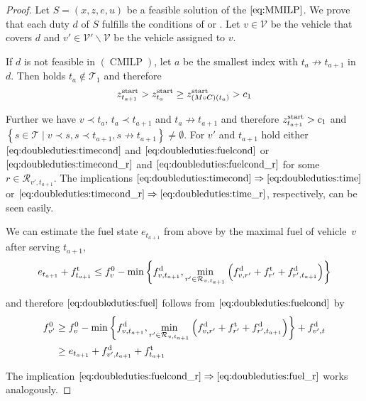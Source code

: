 \begin{proof}

Let $S=\left(x,z,e,u\right)$ be a feasible solution of the $\eqref{eq:MMILP}$. We prove that each duty $d$ of $S$ fulfills the conditions of  or . Let ${v\in\mathcal{V}}$ be the vehicle that covers $d$ and ${v'\in\mathcal{V}'\backslash\mathcal{V}}$ be the vehicle assigned to $v$.

If $d$ is not feasible in $(\operatorname{CMILP})$, let $a$ be the smallest index with ${t_a\not\to t_{a+1}}$ in $d$. Then holds ${t_a\not\in\mathcal{T}_1}$ and therefore
\begin{align*}
	 z^{\operatorname{start}}_{t_{a+1}} > z^{\operatorname{start}}_{t_a} \geq z^{\operatorname{start}}_{\left(M\circ C\right)\left(t_a\right)} > c_1
\end{align*}

Further we have $v\prec t_a$, $t_a\prec t_{a+1}$ and $t_a\not\to t_{a+1}$ and therefore ${z^{\operatorname{start}}_{t_{a+1}}>c_1}$ and ${\left\{s\in\mathcal{T}\mid v\prec s, s\prec t_{a+1}, s\not\to t_{a+1}\right\}\neq\emptyset}$. For $v'$ and $t_{a+1}$ hold either $\eqref{eq:doubleduties:timecond}$ and $\eqref{eq:doubleduties:fuelcond}$ or $\eqref{eq:doubleduties:timecond_r}$ and $\eqref{eq:doubleduties:fuelcond_r}$ for some ${r\in\mathcal{R}_{v',t_{a+1}}}$. The implications ${\eqref{eq:doubleduties:timecond}\Rightarrow\eqref{eq:doubleduties:time}}$ or ${\eqref{eq:doubleduties:timecond_r}\Rightarrow\eqref{eq:doubleduties:time_r}}$, respectively, can be seen easily.

We can estimate the fuel state $e_{t_{a+1}}$ from above by the maximal fuel of vehicle~$v$ after serving $t_{a+1}$, \ie
\begin{align*}
	e_{t_{a+1}} + f^{\operatorname{t}}_{t_{a+1}} \leq f^0_v - \min\left\{f^{\operatorname{d}}_{v,t_{a+1}}, \min_{r'\in\mathcal{R}_{v,t_{a+1}}}\left(f^{\operatorname{d}}_{v,r'}+f^{\operatorname{t}}_{r'}+f^{\operatorname{d}}_{r',t_{a+1}}\right)\right\}
\end{align*}

and therefore $\eqref{eq:doubleduties:fuel}$ follows from $\eqref{eq:doubleduties:fuelcond}$ by
\begin{align*}
	f^0_{v'} & \geq f^0_v - \min\left\{f^{\operatorname{d}}_{v,t_{a+1}}, \min_{r'\in\mathcal{R}_{v,t_{a+1}}}\left(f^{\operatorname{d}}_{v,r'}+f^{\operatorname{t}}_{r'}+f^{\operatorname{d}}_{r',t_{a+1}}\right)\right\} + f^{\operatorname{d}}_{v',t} \\
	& \geq e_{t_{a+1}} + f^{\operatorname{d}}_{v',t_{a+1}} + f^{\operatorname{t}}_{t_{a+1}}
\end{align*}

The implication ${\eqref{eq:doubleduties:fuelcond_r}\Rightarrow\eqref{eq:doubleduties:fuel_r}}$ works analogously.


\end{proof}
